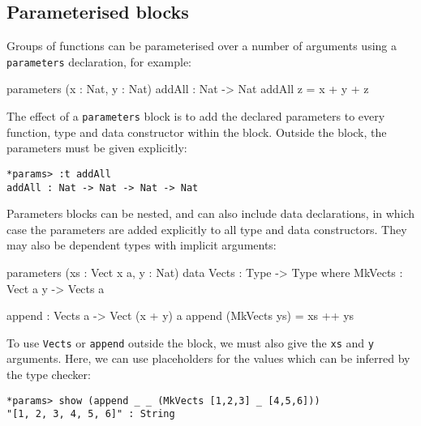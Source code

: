 \subsection{Parameterised blocks}

Groups of functions can be parameterised over a number of arguments using a \texttt{parameters} declaration, for example:

\begin{code}
parameters (x : Nat, y : Nat)
    addAll : Nat -> Nat
    addAll z = x + y + z
\end{code}

\noindent
The effect of a \texttt{parameters} block is to add the declared parameters to every function, type and data constructor within the block.
Outside the block, the parameters must be given explicitly:

\begin{lstlisting}
*params> :t addAll
addAll : Nat -> Nat -> Nat -> Nat
\end{lstlisting}

\noindent
Parameters blocks can be nested, and can also include data declarations, in which case the parameters are added explicitly to all type and data constructors.
They may also be dependent types with implicit arguments:

\begin{code}
parameters (xs : Vect x a, y : Nat)
    data Vects : Type -> Type where
         MkVects : Vect a y -> Vects a
  
    append : Vects a -> Vect (x + y) a
    append (MkVects ys) = xs ++ ys
\end{code}

\noindent
To use \texttt{Vects} or \texttt{append} outside the block, we must also give the \texttt{xs} and \texttt{y} arguments.
Here, we can use placeholders for the values which can be inferred by the type checker:

\begin{lstlisting}
*params> show (append _ _ (MkVects [1,2,3] _ [4,5,6]))
"[1, 2, 3, 4, 5, 6]" : String
\end{lstlisting}
